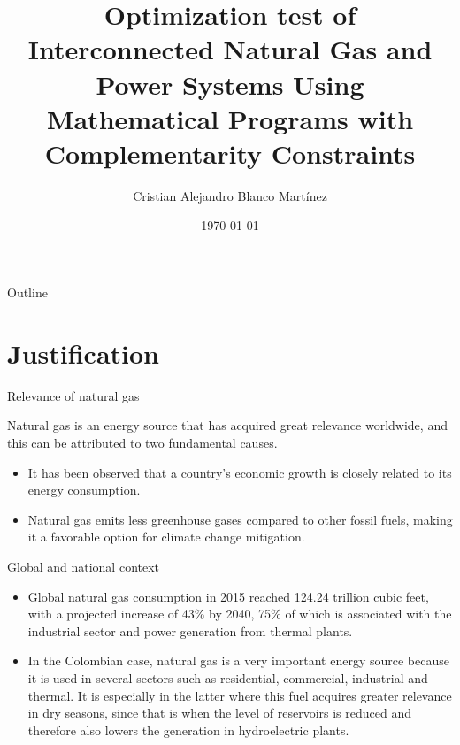 \documentclass[hyperref={colorlinks,citecolor=blue,linkcolor=blue,urlcolor=blue}]{beamer}
\title[]{Optimization test of Interconnected Natural Gas and Power Systems Using Mathematical Programs with Complementarity Constraints}
\author{Cristian Alejandro Blanco Martínez}
\institute{Universidad Tecnológica de Pereira \\ 
Grupo de investigación Automática}
\date{\today}
\begin{document}
\begin{frame}
  \titlepage
\end{frame}

\begin{frame}{Outline}
  \tableofcontents
\end{frame}

\section{Justification}
\begin{frame}{Relevance of natural gas}

Natural gas is an energy source that has acquired great relevance worldwide, and this can be attributed to two fundamental causes. 

\begin{itemize}
    \item It has been observed that a country's economic growth is closely related to its energy consumption.
    
    \item Natural gas emits less greenhouse gases compared to other fossil fuels, making it a favorable option for climate change mitigation.    
\end{itemize}

\end{frame}


\begin{frame}{Global and national context}

\begin{itemize}
    \item Global natural gas consumption in 2015 reached 124.24 trillion cubic feet, with a projected increase of 43\% by 2040, 75\% of which is associated with the industrial sector and power generation from thermal plants. 
    
    \item In the Colombian case, natural gas is a very important energy source because it is used in several sectors such as residential, commercial, industrial and thermal. It is especially in the latter where this fuel acquires greater relevance in dry seasons, since that is when the level of reservoirs is reduced and therefore also lowers the generation in hydroelectric plants. 

\end{itemize}

\end{frame}
\end{document}
